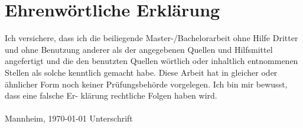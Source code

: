 \documentclass[11pt,titlepage,oneside,openany]{article}
\begin{document}
\section*{Ehrenw\"ortliche Erkl\"arung}
Ich versichere, dass ich die beiliegende Master-/Bachelorarbeit ohne Hilfe Dritter
und ohne Benutzung anderer als der angegebenen Quellen und Hilfsmittel
angefertigt und die den benutzten Quellen w\"ortlich oder inhaltlich
entnommenen Stellen als solche kenntlich gemacht habe. Diese Arbeit
hat in gleicher oder \"ahnlicher Form noch keiner Pr\"ufungsbeh\"orde
vorgelegen. Ich bin mir bewusst, dass eine falsche Er- kl\"arung rechtliche Folgen haben
wird.
\\
\\

\noindent
Mannheim, \today \hspace{4cm} Unterschrift
\end{document}
